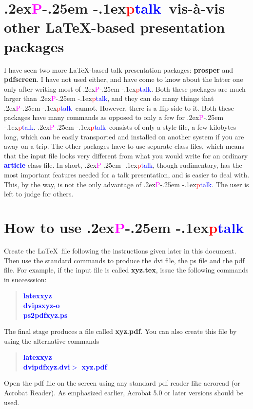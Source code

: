 \documentclass[12pt]{article}
\def\pptalk{{
\raise.2ex\hbox{\textcolor{magenta}P}\kern-.25em
\raise-.1ex\hbox{\textcolor{red}p}\textcolor{blue}{talk}}}
\def\noncomm#1{{\textcolor{blue}{\bf #1}}}
\def\file#1{\textcolor{darkpurple}{\bf #1}}
\begin{document}
\section{\pptalk\ vis-\`a-vis other \LaTeX-based presentation packages}
%
I have seen two more \LaTeX-based talk presentation packages:
\file{prosper} and \file{pdfscreen}.  I have not used either, and have
come to know about the latter one only after writing most of \pptalk.
Both these packages are much larger than \pptalk, and they can do many
things that \pptalk\ cannot.  However, there is a flip side to it.
Both these packages have many commands as opposed to only a few for
\pptalk.  \pptalk\ consists of only a style file, a few kilobytes
long, which can be easily transported and installed on another system
if you are away on a trip.  The other packages have to use separate
class files, which means that the input file looks very different from
what you would write for an ordinary \noncomm{article} class file.  In
short, \pptalk, though rudimentary, has the most important features
needed for a talk presentation, and is easier to deal with.  This, by
the way, is not the only advantage of \pptalk.  The user is left to
judge for others.

\endslide



\beginslide

\section{How to use \pptalk}
%
Create the \LaTeX\ file following the instructions given later in this
document.  Then use the standard commands to produce the dvi file, the
ps file and the pdf file.  For example, if the input file is called
\file{xyz.tex}, issue the following commands in successsion:
%
\begin{quote}
\noncomm{latex\quad xyz\\
dvips\quad xyz\quad  -o\\
ps2pdf\quad  xyz.ps}
\end{quote}
%
The final stage produces a file called \file{xyz.pdf}.  You can also
create this file by using the alternative commands
%
\begin{quote}
\noncomm{latex\quad xyz\\
dvipdf\quad xyz.dvi\quad  $>$ \quad xyz.pdf}
\end{quote}
%
Open the pdf file on the screen using any standard pdf reader like
acroread (or Acrobat Reader).  As emphasized earlier, Acrobat 5.0 or
later versions should be used.
\end{document}

